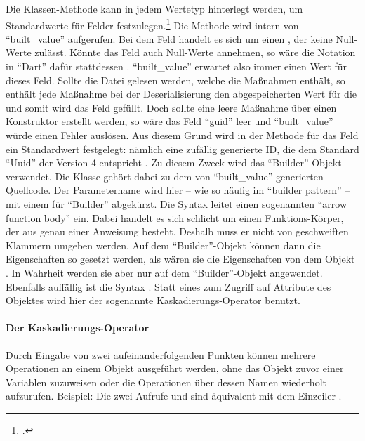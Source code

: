 Die Klassen-Methode  kann in jedem Wertetyp hinterlegt werden, um Standardwerte für Felder festzulegen.\footcite[Vgl.][]{BuiltValueChangelog}
Die Methode wird intern von \enquote{built_value} aufgerufen.
Bei dem Feld  handelt es sich um einen , der keine Null-Werte zulässt.
Könnte das Feld auch Null-Werte annehmen, so wäre die Notation in \enquote{Dart} dafür stattdessen . \enquote{built_value} erwartet also immer einen Wert für dieses Feld.
Sollte die Datei gelesen werden,
welche die Maßnahmen enthält, so enthält jede Maßnahme bei der Deserialisierung den abgespeicherten Wert für die  und somit wird das Feld gefüllt.
Doch sollte eine leere Maßnahme über einen Konstruktor erstellt werden, so wäre das Feld \enquote{guid} leer und \enquote{built_value} würde einen Fehler auslösen.
Aus diesem Grund wird in der Methode  für das Feld  ein Standardwert festgelegt: nämlich eine zufällig generierte ID,
die dem Standard \enquote{Uuid} der Version 4 entspricht .
Zu diesem Zweck wird das \enquote{Builder}-Objekt verwendet.
Die Klasse  gehört dabei zu dem von \enquote{built_value} generierten Quellcode.
Der Parametername wird hier -- wie so häufig im \enquote{builder pattern} -- mit einem  für \enquote{Builder} abgekürzt.
Die Syntax \IC{=>} leitet  einen sogenannten \enquote{arrow function body} ein.
Dabei handelt es sich schlicht um einen Funktions-Körper, der aus genau einer Anweisung besteht. 
Deshalb muss er nicht von geschweiften Klammern umgeben werden.
Auf dem \enquote{Builder}-Objekt können dann die Eigenschaften so gesetzt werden, als wären sie die Eigenschaften von dem Objekt .
In Wahrheit werden sie aber nur auf dem \enquote{Builder}-Objekt angewendet.
Ebenfalls auffällig ist die Syntax .
Statt eines  zum Zugriff auf Attribute des Objektes wird hier der sogenannte Kaskadierungs-Operator  benutzt.

\paragraph{Der Kaskadierungs-Operator}

Durch Eingabe von zwei aufeinanderfolgenden Punkten  können mehrere Operationen an einem Objekt ausgeführt werden,
ohne das Objekt zuvor einer Variablen zuzuweisen oder die Operationen über dessen Namen wiederholt aufzurufen.
Beispiel: Die zwei Aufrufe  und  sind äquivalent mit dem Einzeiler . 

